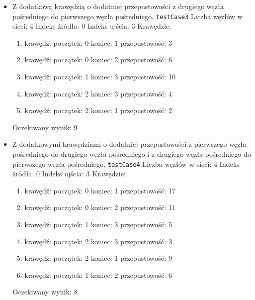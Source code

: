 \begin{itemize}[nosep]
    \item Z dodatkową krawędzią o dodatniej przepustowości z drugiego węzła
    pośredniego do pierwszego węzła pośredniego.
    \texttt{testCase3}
    Liczba węzłów w sieci: 4
    Indeks źródła: 0
    Indeks ujścia: 3
    Krawędzie:
    \begin{enumerate}[nosep]
        \item krawędź:
        początek: 0
        koniec: 1
        przepustowość: 3
        \item krawędź:
        początek: 0
        koniec: 2
        przepustowość: 6
        \item krawędź:
        początek: 1
        koniec: 3
        przepustowość: 10
        \item krawędź:
        początek: 2
        koniec: 3
        przepustowość: 4
        \item krawędź:
        początek: 2
        koniec: 1
        przepustowość: 2
    \end{enumerate}
    Oczekiwany wynik: 9

    \item Z dodatkowymi krawędziami o dodatniej przepustowości z pierwszego
    węzła pośredniego do drugiego węzła pośredniego i z drugiego węzła
    pośredniego do pierwszego węzła pośredniego.
    \texttt{testCase4}
    Liczba węzłów w sieci: 4
    Indeks źródła: 0
    Indeks ujścia: 3
    Krawędzie:
    \begin{enumerate}[nosep]
        \item krawędź:
        początek: 0
        koniec: 1
        przepustowość: 17
        \item krawędź:
        początek: 0
        koniec: 2
        przepustowość: 11
        \item krawędź:
        początek: 1
        koniec: 3
        przepustowość: 5
        \item krawędź:
        początek: 2
        koniec: 3
        przepustowość: 3
        \item krawędź:
        początek: 2
        koniec: 1
        przepustowość: 9
        \item krawędź:
        początek: 1
        koniec: 2
        przepustowość: 6
    \end{enumerate}
    Oczekiwany wynik: 8


\end{itemize}
